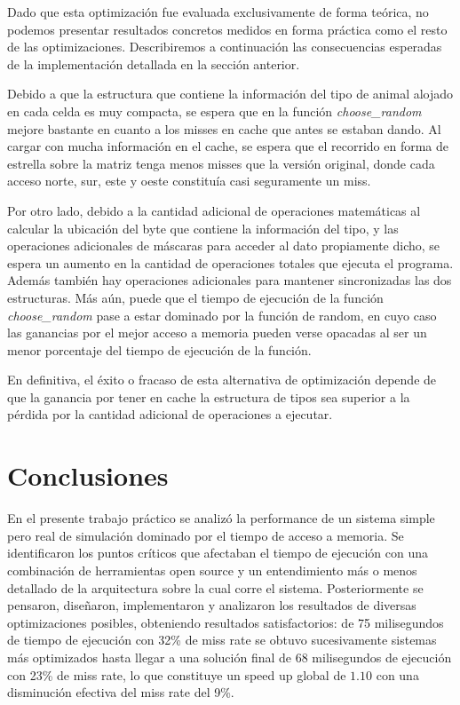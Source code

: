 \documentclass[a4paper,11pt]{article}
\begin{document}
Dado que esta optimización fue evaluada exclusivamente de forma teórica, no
podemos presentar resultados concretos medidos en forma práctica como el resto
de las optimizaciones. Describiremos a continuación las consecuencias esperadas
de la implementación detallada en la sección anterior.

Debido a que la estructura que contiene la información del tipo de animal
alojado en cada celda es muy compacta, se espera que en la función
\textit{choose\_random} mejore bastante en cuanto a los misses en cache que
antes se estaban dando. Al cargar con mucha información en el cache, se espera
que el recorrido en forma de estrella sobre la matriz tenga menos misses que la
versión original, donde cada acceso norte, sur, este y oeste constituía casi
seguramente un miss.

Por otro lado, debido a la cantidad adicional de operaciones matemáticas al
calcular la ubicación del byte que contiene la información del tipo, y las
operaciones adicionales de máscaras para acceder al dato propiamente dicho, se
espera un aumento en la cantidad de operaciones totales que ejecuta el
programa. Además también hay operaciones adicionales para mantener
sincronizadas las dos estructuras. Más aún, puede que el tiempo de ejecución de
la función \textit{choose\_random} pase a estar dominado por la función de
random, en cuyo caso las ganancias por el mejor acceso a memoria pueden verse
opacadas al ser un menor porcentaje del tiempo de ejecución de la función.

En definitiva, el éxito o fracaso de esta alternativa de optimización depende
de que la ganancia por tener en cache la estructura de tipos sea superior a la
pérdida por la cantidad adicional de operaciones a ejecutar.

\section{Conclusiones}

En el presente trabajo práctico se analizó la performance de un sistema simple
pero real de simulación dominado por el tiempo de acceso a memoria. Se
identificaron los puntos críticos que afectaban el tiempo de ejecución con una
combinación de herramientas open source y un entendimiento más o menos
detallado de la arquitectura sobre la cual corre el sistema. Posteriormente se
pensaron, diseñaron, implementaron y analizaron los resultados de diversas
optimizaciones posibles, obteniendo resultados satisfactorios: de 75
milisegundos de tiempo de ejecución con 32\% de miss rate se obtuvo
sucesivamente sistemas más optimizados hasta llegar a una solución final de 68
milisegundos de ejecución con 23\% de miss rate, lo que constituye un speed up
global de \(1.10\) con una disminución efectiva del miss rate del 9\%.
\end{document}
